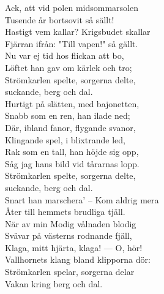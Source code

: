 \documentclass[a6paper,10pt]{article}
\begin{document}
\begin{lyrics}
\newpage
\setlength{\oddsidemargin}{-0.47in}
\noindent
Ack, att vid polen midsommarsolen\\
Tusende år bortsovit så sällt!\\
Hastigt vem kallar? Krigsbudet skallar\\
Fjärran ifrån: "Till vapen!" så gällt.\\
Nu var ej tid hos flickan att bo,\\
Löftet han gav om kärlek och tro;\\
Strömkarlen spelte, sorgerna delte,\\
suckande, berg och dal.
\vspace{5pt}\\
Hurtigt på slätten, med bajonetten,\\
Snabb som en ren, han ilade ned;\\
Där, ibland fanor, flygande svanor,\\
Klingande spel, i blixtrande led,\\
Rak som en tall, han höjde sig opp,\\
Såg jag hans bild vid tårarnas lopp.\\
Strömkarlen spelte, sorgerna delte,\\
suckande, berg och dal.
\vspace{5pt}\\
Snart han marschera' -- Kom aldrig mera\\
Åter till hemmets brudliga tjäll.\\
När av min Modig vålnaden blodig\\
Svävar på västerns rodnande fjäll,\\
Klaga, mitt hjärta, klaga! — O, hör!\\
Vallhornets klang bland klipporna dör:\\
Strömkarlen spelar, sorgerna delar\\
Vakan kring berg och dal.
\end{lyrics}
\end{document}
